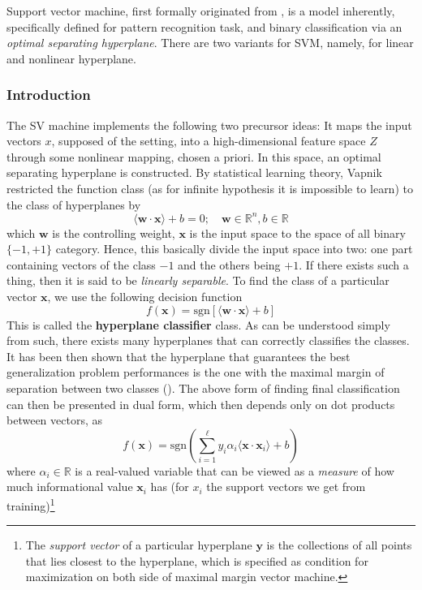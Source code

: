 \documentclass[10pt]{article} %
\begin{document}
Support vector machine, first formally originated from \cite{Vapnik1999-VAPTNO}, is a model inherently, specifically defined for pattern recognition task, and binary classification via an \textit{optimal separating hyperplane}. There are two variants for SVM, namely, for linear and nonlinear hyperplane. 

\subsubsection{Introduction}

The SV machine implements the following two precursor ideas: It maps the input vectors $x$, supposed of the setting, into a high-dimensional feature space $Z$ through some nonlinear mapping, chosen a priori. In this space, an optimal separating hyperplane is constructed. By statistical learning theory, Vapnik restricted the function class (as for infinite hypothesis it is impossible to learn) to the class of hyperplanes by 
\begin{equation}
    \langle \mathbf{w}\cdot \mathbf{x} \rangle + b = 0 ; \quad \mathbf{w}\in \mathbb{R}^{n} , b\in \mathbb{R}
\end{equation}
which $\mathbf{w}$ is the controlling weight, $\mathbf{x}$ is the input space to the space of all binary $\{-1,+1\}$ category. Hence, this basically divide the input space into two: one part containing vectors of the class $-1$ and the others being $+1$. If there exists such a thing, then it is said to be \textit{linearly separable}. To find the class of a particular vector $\mathbf{x}$, we use the following decision function 
\begin{equation}
    f(\mathbf{x}) = \mathrm{sgn}[\langle \mathbf{w}\cdot \mathbf{x}\rangle+ b]
\end{equation}
This is called the \textbf{hyperplane classifier} class. As can be understood simply from such, there exists many hyperplanes that can correctly classifies the classes. It has been then shown that the hyperplane that guarantees the best generalization problem performances is the one with the maximal margin of separation between two classes (\cite{Cristianini2000AnIT}). The above form of finding final classification can then be presented in dual form, which then depends only on dot products between vectors, as 
\begin{equation}
    f(\mathbf{x}) = \mathrm{sgn}\left(\sum^{\ell}_{i=1} y_{i}\alpha_{i} \langle \mathbf{x}\cdot \mathbf{x}_{i} \rangle+ b\right)
\end{equation} where $\alpha_{i}\in \mathbb{R}$ is a real-valued variable that can be viewed as a \textit{measure} of how much informational value $\mathbf{x}_{i}$ has (for $x_{i}$ the support vectors we get from training)\footnote{The \textit{support vector} of a particular hyperplane $\mathbf{y}$ is the collections of all points that lies closest to the hyperplane, which is specified as condition for maximization on both side of maximal margin vector machine.}
\end{document}

